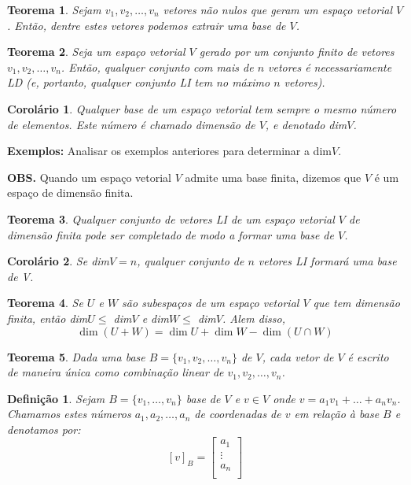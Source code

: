 \documentclass[oneside,a4paper,12pt]{article}
\newtheorem{theorem}{Teorema}[section]
\newtheorem{definition}{Definição}[section]
\newtheorem{corollary}{Corolário}[section]
\begin{document}
\begin{theorem}
	Sejam $v_1, v_2, \dots, v_n$ vetores não nulos que geram um espaço vetorial $V$. Então, dentre estes vetores podemos extrair uma base de $V$.
\end{theorem}

\begin{theorem}
	Seja um espaço vetorial $V$ gerado por um conjunto finito de vetores $v_1, v_2, \dots, v_n$. Então, qualquer conjunto com mais de $n$ vetores é necessariamente LD (e, portanto, qualquer conjunto LI tem no máximo $n$ vetores).
\end{theorem}

\begin{corollary}
	Qualquer base de um espaço vetorial tem sempre o mesmo número de elementos. Este número é chamado \emph{dimensão de} $V$, e denotado \emph{dim}$V$.
\end{corollary}

{\bf Exemplos:} Analisar os exemplos anteriores para determinar a dim$V$.

{\bf OBS.} Quando um espaço vetorial $V$ admite uma base finita, dizemos que $V$ é um espaço de dimensão finita.

\begin{theorem}
	Qualquer conjunto de vetores LI de um espaço vetorial $V$ de dimensão finita pode ser completado de modo a formar uma base de $V$.
\end{theorem}

\begin{corollary}
	Se \emph{dim}$V = n$, qualquer conjunto de $n$ vetores LI formará uma base de V.
\end{corollary}

\begin{theorem}
	Se $U$ e $W$ são subespaços de um espaço vetorial $V$ que tem dimensão finita, então \emph{dim}$U \leq $ \emph{dim}$V$ e \emph{dim}$W \leq $ \emph{dim}$V$. Alem disso,
	$$\dim(U + W) = \dim U + \dim W - \dim(U \cap W)$$
\end{theorem}

\begin{theorem}
	Dada uma base $B = \{ v_1, v_2, \dots, v_n \}$ de $V$, cada vetor de $V$ é escrito de maneira única como combinação linear de $v_1, v_2, \dots, v_n$.
\end{theorem}

\begin{definition}
	Sejam $B = \{ v_1, \dots, v_n \}$ base de $V$ e $v \in V$ onde $v = a_1 v_1 + \dots + a_n v_n$. Chamamos estes números $a_1, a_2, \dots, a_n$ de coordenadas de $v$ em relação à base $B$ e denotamos por:
	$$[v]_B = \left[
	\begin{array}{c}
	a_1	\\
	\vdots	\\
	a_n \\
	\end{array}
	\right]$$
\end{definition}
\end{document}
